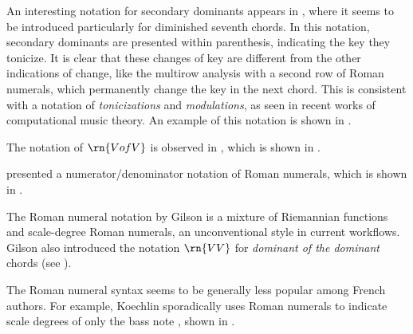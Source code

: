 
An interesting notation for secondary dominants appears in
\textcite{white1911harmonic}, where it seems to be
introduced particularly for diminished seventh chords. In
this notation, secondary dominants are presented within
parenthesis, indicating the key they tonicize. It is clear
that these changes of key are different from the other
indications of change, like the multirow analysis with a
second row of Roman numerals, which permanently change the
key in the next chord. This is consistent with a notation of
\emph{tonicizations} and \emph{modulations}, as seen in
recent works of computational music theory. An example of
this notation is shown in
.


The notation of $\rn{V of V}$ is observed in
\textcite{mokrejs1913lessons}, which is shown in
.


\textcite{gilson1919traite} presented a
numerator/denominator notation of Roman numerals, which is
shown in .



The Roman numeral notation by Gilson is a mixture of
Riemannian functions and scale-degree Roman numerals, an
unconventional style in current workflows. Gilson also
introduced the notation $\rn{VV}$ for \emph{dominant of the
dominant} chords (see
).

The Roman numeral syntax seems to be generally less popular
among French authors. For example, Koechlin sporadically
uses Roman numerals to indicate scale degrees of only the
bass note \textcite{koechlin1928traite}, shown in
.

